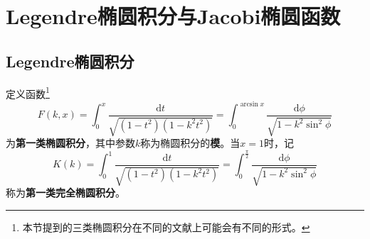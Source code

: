 

 



\chapter{Legendre椭圆积分与Jacobi椭圆函数}\label{椭圆积分与Jacobi椭圆函数}

\section{Legendre椭圆积分}

定义函数\footnote{本节提到的三类椭圆积分在不同的文献上可能会有不同的形式。}
\begin{equation}
	F(k,x) = \int_0^x \frac{\mathrm{d}t}{\sqrt{(1-t^2)(1-k^2t^2)}} = \int_0^{\arcsin x} \frac{\mathrm{d}\phi}{\sqrt{1-k^2\sin^2\phi}}
	\label{第一类椭圆积分-定义}
\end{equation}
为{\bf 第一类椭圆积分}，其中参数$k$称为椭圆积分的{\bf 模}。当$x=1$时，记
\begin{equation}
	K(k) = \int_0^1 \frac{\mathrm{d}t}{\sqrt{(1-t^2)(1-k^2t^2)}} = \int_0^{\frac{\pi}{2}} \frac{\mathrm{d}\phi}{\sqrt{1-k^2\sin^2\phi}}
	\label{chp6:第一类完全椭圆积分-定义}
\end{equation}
称为{\bf 第一类完全椭圆积分}。

